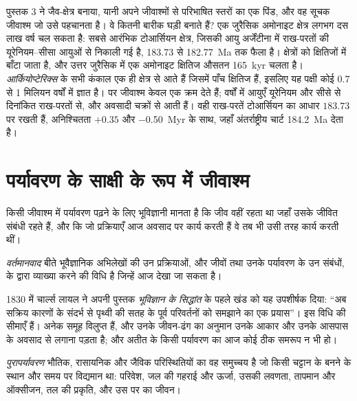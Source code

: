 पुस्तक 3 ने जैव-क्षेत्र बनाया, यानी अपने जीवाश्मों से परिभाषित स्तरों का एक पिंड, और वह सूचक
जीवाश्म जो उसे पहचानता है। वे कितनी बारीक घड़ी बनाते हैं? एक जुरैसिक अमोनाइट क्षेत्र
लगभग दस लाख वर्ष चल सकता है: सबसे आरंभिक टोआर्सियन क्षेत्र, जिसकी आयु अर्जेंटीना में राख-परतों की
यूरेनियम--सीसा आयुओं से निकाली गई है, 183.73 से \qty{182.77}{Ma} तक फैला है। क्षेत्रों को क्षितिजों में बाँटा जाता है, और उत्तर
जुरैसिक में एक अमोनाइट क्षितिज औसतन \qty{165}{kyr} चलता है।
\emph{आर्कियोप्टेरिक्स} के सभी कंकाल एक ही क्षेत्र से आते हैं जिसमें पाँच क्षितिज हैं, इसलिए यह पक्षी
कोई 0.7 से 1 मिलियन वर्षों में ज्ञात है। पर जीवाश्म केवल एक क्रम देते हैं; वर्षों में आयुएँ
यूरेनियम और सीसे से दिनांकित राख-परतों से, और अवसादी चक्रों से आती हैं। वही राख-परतें टोआर्सियन का आधार $183.73$ पर रखती हैं, अनिश्चितता
$+0.35$ और \qty{-0.50}{Myr} के साथ, जहाँ अंतर्राष्ट्रीय चार्ट \qty{184.2}{Ma} देता है।

\section{पर्यावरण के साक्षी के रूप में जीवाश्म}\label{sec:b2:palaeoenvironments:environment}

किसी जीवाश्म में पर्यावरण पढ़ने के लिए भूविज्ञानी मानता है कि जीव वहीं रहता था जहाँ उसके जीवित
संबंधी रहते हैं, और कि जो प्रक्रियाएँ आज अवसाद पर कार्य करती हैं वे तब भी उसी तरह कार्य करती थीं।

\begin{definition}[वर्तमानवाद]\label{def:b2:palaeoenvironments:actualism}
\emph{वर्तमानवाद} बीते भूवैज्ञानिक अभिलेखों की उन प्रक्रियाओं, और जीवों
तथा उनके पर्यावरण के उन संबंधों, के द्वारा व्याख्या करने की विधि है जिन्हें आज देखा जा सकता है।
\end{definition}

1830 में चार्ल्स लायल ने अपनी पुस्तक \emph{भूविज्ञान के सिद्धांत} के पहले खंड को यह उपशीर्षक दिया: ``अब
सक्रिय कारणों के संदर्भ से पृथ्वी की सतह के पूर्व परिवर्तनों को समझाने का एक
प्रयास''। इस विधि की सीमाएँ हैं। अनेक समूह विलुप्त हैं, और उनके जीवन-ढंग का
अनुमान उनके आकार और उनके आसपास के अवसाद से लगाना पड़ता है; और अतीत के किसी पर्यावरण का
आज कोई ठीक समरूप न भी हो।

\begin{definition}[पुरापर्यावरण]\label{def:b2:palaeoenvironments:palaeoenvironment}
\emph{पुरापर्यावरण} भौतिक, रासायनिक और
जैविक परिस्थितियों का वह समुच्चय है जो किसी चट्टान के बनने के स्थान और समय पर विद्यमान था: परिवेश, जल की गहराई और
ऊर्जा, उसकी लवणता, तापमान और ऑक्सीजन, तल की प्रकृति, और उस पर का
जीवन।
\end{definition}

